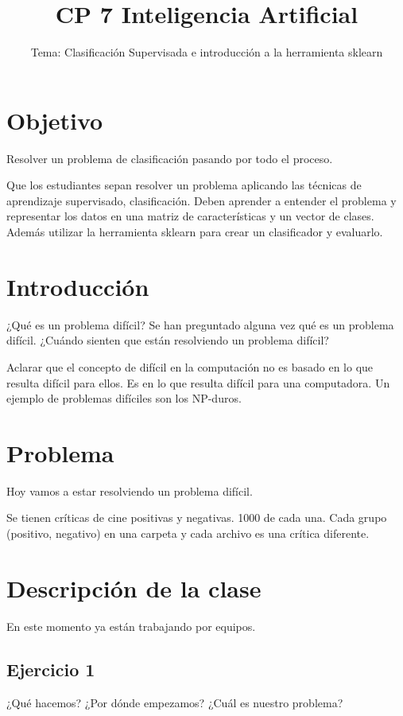 \documentclass[a4paper,10pt]{article}
\title{CP 7 Inteligencia Artificial}
\author{Tema: Clasificación Supervisada e introducción a la 
herramienta sklearn}
\date{}
\begin{document}
\maketitle

\section*{Objetivo}
	Resolver un problema de clasificación pasando por todo el
	proceso.

  Que los estudiantes sepan resolver un problema aplicando las
  técnicas de aprendizaje supervisado, clasificación. Deben aprender a entender
  el problema y representar los datos en una matriz de
  características y un vector de clases. Además utilizar la herramienta 
  sklearn para crear un clasificador y evaluarlo.

\section*{Introducción}
  ¿Qué es un problema difícil?
  Se han preguntado alguna vez qué es un problema difícil.
  ¿Cuándo sienten que están resolviendo un problema difícil?
  
  Aclarar que el concepto de difícil en la computación no es 
  basado en lo que resulta difícil para ellos. Es en lo que
  resulta difícil para una computadora. Un ejemplo de problemas
  difíciles son los NP-duros.
  
\section*{Problema}
  Hoy vamos a estar resolviendo un problema difícil.
  
  Se tienen críticas de cine positivas y negativas. 1000 de cada una.
  Cada grupo (positivo, negativo) en una carpeta y cada archivo
  es una crítica diferente.
  
\section*{Descripción de la clase}

En este momento ya están trabajando por equipos.

  \subsection*{Ejercicio 1}
    ¿Qué hacemos?
    ¿Por dónde empezamos?
    ¿Cuál es nuestro problema?
    
\end{document}
